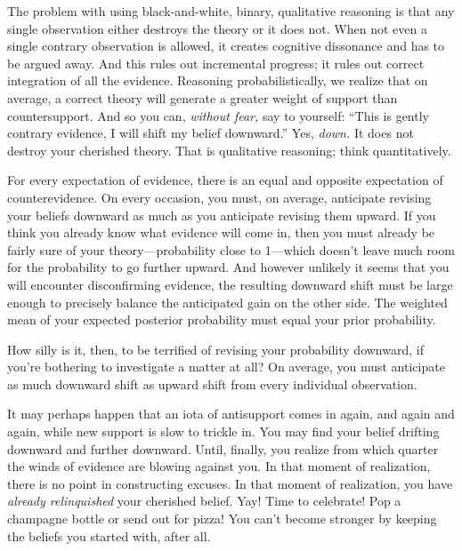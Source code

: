 {
 The problem with using black-and-white, binary, qualitative
reasoning is that any single observation either destroys the theory or
it does not. When not even a single contrary observation is allowed, it
creates cognitive dissonance and has to be argued away. And this rules
out incremental progress; it rules out correct integration of all the
evidence. Reasoning probabilistically, we realize that on average, a
correct theory will generate a greater weight of support than
countersupport. And so you can, \textit{without fear,} say to yourself:
``This is gently contrary evidence, I will shift my
belief downward.'' Yes, \textit{down.} It does not
destroy your cherished theory. That is qualitative reasoning; think
quantitatively.}

{
 For every expectation of evidence, there is an equal and opposite
expectation of counterevidence. On every occasion, you must, on
average, anticipate revising your beliefs downward as much as you
anticipate revising them upward. If you think you already know what
evidence will come in, then you must already be fairly sure of your
theory---probability close to 1---which doesn't leave
much room for the probability to go further upward. And however
unlikely it seems that you will encounter disconfirming evidence, the
resulting downward shift must be large enough to precisely balance the
anticipated gain on the other side. The weighted mean of your expected
posterior probability must equal your prior probability.}

{
 How silly is it, then, to be terrified of revising your
probability downward, if you're bothering to
investigate a matter at all? On average, you must anticipate as much
downward shift as upward shift from every individual observation.}

{
 It may perhaps happen that an iota of antisupport comes in again,
and again and again, while new support is slow to trickle in. You may
find your belief drifting downward and further downward. Until,
finally, you realize from which quarter the winds of evidence are
blowing against you. In that moment of realization, there is no point
in constructing excuses. In that moment of realization, you have
\textit{already relinquished} your cherished belief. Yay! Time to
celebrate! Pop a champagne bottle or send out for pizza! You
can't become stronger by keeping the beliefs you
started with, after all.}

\myendsectiontext


